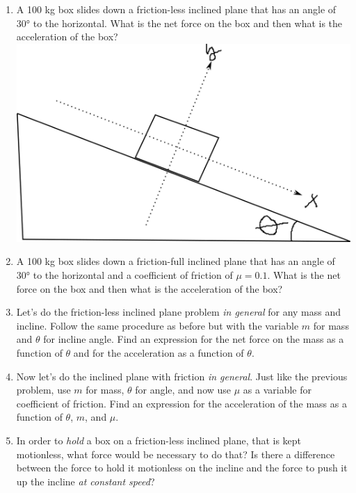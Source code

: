 \begin{enumerate}
\item A 100 kg box slides down a friction-less inclined plane that has an angle of \ang{30} to the horizontal. What is the net force on the box and then what is the acceleration of the box?
\includegraphics[scale=0.75]{week-3-incline-plane.png}
\bigskip

\item A 100 kg box slides down a friction-full inclined plane that has an angle of \ang{30} to the horizontal and a coefficient of friction of $\mu=0.1$. What is the net force on the box and then what is the acceleration of the box?\giantskip

\item Let's do the friction-less inclined plane problem \emph{in general} for any mass and incline. Follow the same procedure as before but with the variable $m$ for mass and $\theta$ for incline angle. Find an expression for the net force on the mass as a function of $\theta$ and for the acceleration as a function of $\theta$.\giantskip 

\item Now let's do the inclined plane with friction \emph{in general}. Just like the previous problem, use $m$ for mass, $\theta$ for angle, and now use $\mu$ as a variable for coefficient of friction. Find an expression for the acceleration of the mass as a function of $\theta$, $m$, and $\mu$. \giantskip

\item In order to \emph{hold} a box on a friction-less inclined plane, that is kept motionless, what force would be necessary to do that? Is there a difference between the force to hold it motionless on the incline and the force to push it up the incline \emph{at constant speed}? \giantskip

%
%


\end{enumerate}
